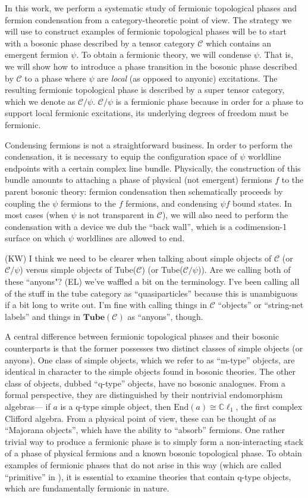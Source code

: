\documentclass[12pt,a4paper]{article}
\newcommand{\mcc}{\mathcal{C}}
\newcommand{\End}{\text{End}}
\newcommand{\cl}{\mathbb{C}\ell}
\newcommand{\tube}{\textbf{Tube}}
\newcommand{\kw}[1]{{\color{kwcolor}\footnotesize{(KW) #1}}}
\newcommand{\ethan}[1]{{\color{amethyst}\footnotesize{(EL) #1}}}
\begin{document}
In this work, we perform a systematic study of fermionic topological phases and fermion condensation from a category-theoretic
point of view. 
The strategy we will use to construct examples of fermionic topological phases will be to start with 
a bosonic phase described by a tensor category $\mcc$
which contains an emergent fermion $\psi$.
To obtain a fermionic theory, we will condense $\psi$.
That is, we will show how to introduce a phase transition in the bosonic phase 
described by $\mcc$ to a phase where $\psi$ are {\it local} (as opposed to anyonic) excitations.
The resulting fermionic topological phase is described by a super tensor category, which we denote
as $\mcc / \psi$.
$\mcc/\psi$ is a fermionic phase because in order for a phase to support local fermionic excitations, 
its underlying degrees of freedom must be fermionic. 

Condensing fermions is not a straightforward business. 
In order to perform the condensation, it is necessary to equip the configuration 
space of $\psi$ worldline endpoints with a certain complex line bundle. 
Physically, the construction of this bundle amounts to attaching a phase of physical (not emergent) fermions $f$ 
to the parent bosonic theory: 
fermion condensation then schematically proceeds by coupling the $\psi$ fermions to 
the $f$ fermions, and condensing $\psi f$ bound states. 
In most cases (when $\psi$ is not transparent in $\mcc$), we will also need to perform 
the condensation with a device we dub the ``back wall'', which is a codimension-1 surface 
on which $\psi$ worldlines are allowed to end. 

\kw{I think we need to be clearer when talking about simple objects of $\mcc$ (or $\mcc/\psi$)
versus simple objects of Tube($\mcc$) (or Tube($\mcc/\psi$)).
Are we calling both of these ``anyons"?}
\ethan{we've waffled a bit on the terminology. I've been calling all of the stuff in the tube category as ``quasiparticles'' because this is unambiguous if a bit long to write out. I'm fine with calling things in $\mcc$ ``objects'' or ``string-net labels'' and things in $\tube(\mcc)$ as ``anyons'', though.}

A central difference between fermionic topological phases and their bosonic counterparts is that 
the former possesses two distinct classes of simple objects (or anyons). 
One class of simple objects, which we refer to as ``m-type'' objects, are identical in character
to the simple objects found in bosonic theories. 
The other class of objects, dubbed ``q-type'' objects, have no bosonic analogues. 
From a formal perspective, they are distinguished by their nontrivial endomorphism algebras---
if $a$ is a q-type simple object, then $\End(a) \cong \cl_1$, the first complex Clifford algebra. 
From a physical point of view, these can be thought of as ``Majorana objects'', which have the ability 
to ``absorb'' fermions. 
One rather trivial way to produce a fermionic phase is to simply form a non-interacting stack of a phase of physical fermions 
and a known bosonic topological phase. 
To obtain examples of fermionic phases that do not arise in this way (which are called ``primitive'' in \cite{Lan2016b}),
it is essential to examine theories that contain q-type objects, which are fundamentally fermionic in nature. 
\end{document}

